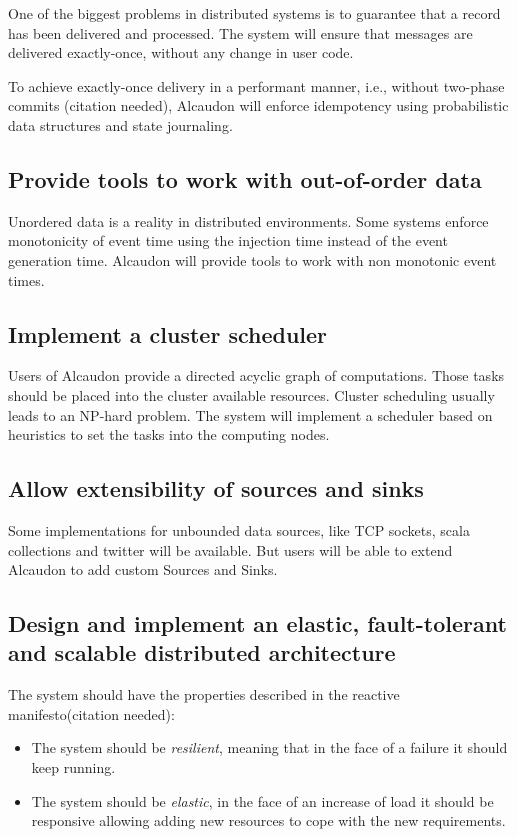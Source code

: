 One of the biggest problems in distributed systems is to guarantee that a record
has been delivered and processed. The system will ensure that messages are
delivered exactly-once, without any change in user code.

To achieve exactly-once delivery in a performant manner, i.e., without two-phase
commits (citation needed), Alcaudon will enforce idempotency using probabilistic
data structures and state journaling.

\subsection{Provide tools to work with out-of-order data}

Unordered data is a reality in distributed environments. Some systems enforce
monotonicity of event time using the injection time instead of the event
generation time. Alcaudon will provide tools to work with non monotonic event
times.

\subsection{Implement a cluster scheduler}

Users of Alcaudon provide a directed acyclic graph of computations. Those
tasks should be placed into the cluster available resources. Cluster scheduling
usually leads to an NP-hard problem. The system will implement a scheduler based
on heuristics to set the tasks into the computing nodes.


\subsection{Allow extensibility of sources and sinks}
Some implementations for unbounded data sources, like TCP sockets, scala collections
and twitter will be available. But users will be able to extend Alcaudon to add
custom Sources and Sinks.

\subsection{Design and implement an elastic, fault-tolerant and scalable distributed architecture}
The system should have the properties described in the reactive manifesto(citation needed):

\begin{itemize}
  \item The system should be \textit{resilient}, meaning that in the face of a failure it should keep running.
  \item The system should be \textit{elastic}, in the face of an increase of load it
    should be responsive allowing adding new resources to cope with the new
    requirements.
\end{itemize}

